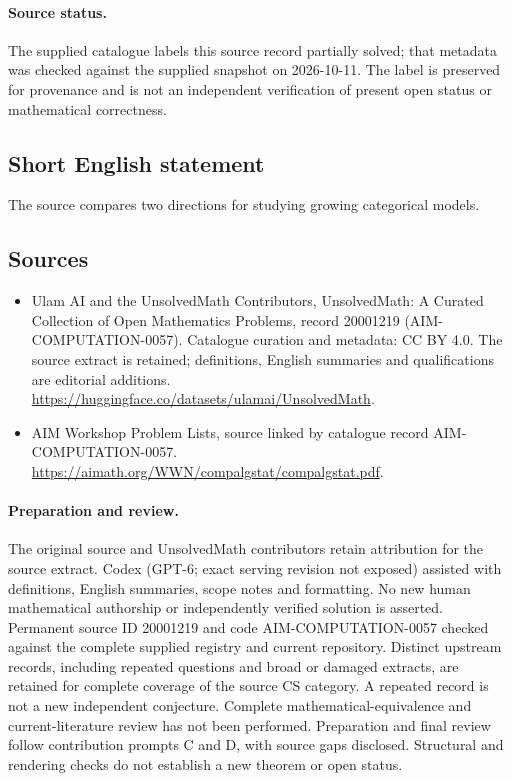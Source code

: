 \documentclass[11pt]{article}
\begin{document}
\paragraph{Source status.}
The supplied catalogue labels this source record partially solved; that metadata was checked against the supplied snapshot on 2026-10-11. The label is preserved for provenance and is not an independent verification of present open status or mathematical correctness.
\subsection{Short English statement}
The source compares two directions for studying growing categorical models.
\subsection{Sources}
\begin{itemize}
\item[\hypertarget{source:20001219:1}{S1}] Ulam AI and the UnsolvedMath Contributors, UnsolvedMath: A Curated Collection of Open Mathematics Problems, record 20001219 (AIM-COMPUTATION-0057). Catalogue curation and metadata: CC BY 4.0. The source extract is retained; definitions, English summaries and qualifications are editorial additions.
\url{https://huggingface.co/datasets/ulamai/UnsolvedMath}.
\item[\hypertarget{source:20001219:2}{S2}] AIM Workshop Problem Lists, source linked by catalogue record AIM-COMPUTATION-0057.
\url{https://aimath.org/WWN/compalgstat/compalgstat.pdf}.
\end{itemize}
\paragraph{Preparation and review.}
The original source and UnsolvedMath contributors retain attribution for the source extract. Codex (GPT-6; exact serving revision not exposed) assisted with definitions, English summaries, scope notes and formatting. No new human mathematical authorship or independently verified solution is asserted. Permanent source ID 20001219 and code AIM-COMPUTATION-0057 checked against the complete supplied registry and current repository. Distinct upstream records, including repeated questions and broad or damaged extracts, are retained for complete coverage of the source CS category. A repeated record is not a new independent conjecture. Complete mathematical-equivalence and current-literature review has not been performed. Preparation and final review follow contribution prompts C and D, with source gaps disclosed. Structural and rendering checks do not establish a new theorem or open status.
\label{end:20001219}
\end{document}
